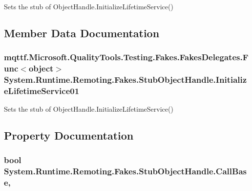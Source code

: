 Sets the stub of Object\-Handle.\-Initialize\-Lifetime\-Service()



\subsection{Member Data Documentation}
\hypertarget{class_system_1_1_runtime_1_1_remoting_1_1_fakes_1_1_stub_object_handle_a8c98cde3d326e793725ac64251e1dc27}{
\subsubsection[{Initialize\-Lifetime\-Service01}]{\setlength{\rightskip}{0pt plus 5cm}mqttf.\-Microsoft.\-Quality\-Tools.\-Testing.\-Fakes.\-Fakes\-Delegates.\-Func$<$object$>$ System.\-Runtime.\-Remoting.\-Fakes.\-Stub\-Object\-Handle.\-Initialize\-Lifetime\-Service01}}\label{class_system_1_1_runtime_1_1_remoting_1_1_fakes_1_1_stub_object_handle_a8c98cde3d326e793725ac64251e1dc27}


Sets the stub of Object\-Handle.\-Initialize\-Lifetime\-Service()



\subsection{Property Documentation}
\hypertarget{class_system_1_1_runtime_1_1_remoting_1_1_fakes_1_1_stub_object_handle_a8a0140f15b4fe71fdf0b88976048bc5c}{
\subsubsection[{Call\-Base}]{\setlength{\rightskip}{0pt plus 5cm}bool System.\-Runtime.\-Remoting.\-Fakes.\-Stub\-Object\-Handle.\-Call\-Base\hspace{0.3cm}{\ttfamily [get]}, {\ttfamily [set]}}}\label{class_system_1_1_runtime_1_1_remoting_1_1_fakes_1_1_stub_object_handle_a8a0140f15b4fe71fdf0b88976048bc5c}


